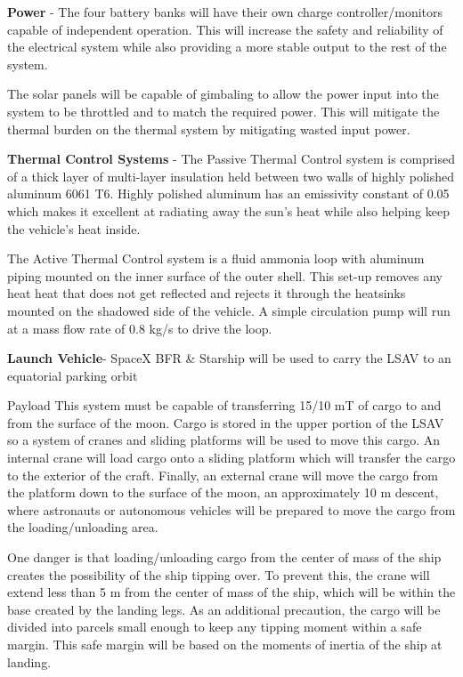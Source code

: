 \documentclass[10pt]{article}
\begin{document}
\textbf{Power} - The four battery banks will have their own charge
controller/monitors capable of independent operation. This will
increase the safety and reliability of the electrical system while
also providing a more stable output to the rest of the system.


The solar panels will be capable of gimbaling to allow the power input
into the system to be throttled and to match the required power. This
will mitigate the thermal burden on the thermal system by mitigating
wasted input power.

\textbf{Thermal Control Systems} - The Passive Thermal Control system
is comprised of a thick layer of multi-layer insulation held between
two walls of highly polished aluminum 6061 T6.  Highly polished
aluminum has an emissivity constant of 0.05 which makes it excellent
at radiating away the sun’s heat while also helping keep the vehicle’s
heat inside.

The Active Thermal Control system is a fluid ammonia loop with
aluminum piping mounted on the inner surface of the outer shell.  This
set-up removes any heat heat that does not get reflected and rejects
it through the heatsinks mounted on the shadowed side of the vehicle.
A simple circulation pump will run at a mass flow rate of 0.8 kg/s to
drive the loop.


\textbf{Launch Vehicle}- SpaceX BFR \& Starship will be used to carry the LSAV
to an equatorial parking orbit

Payload This system must be capable of transferring 15/10 mT of cargo
to and from the surface of the moon. Cargo is stored in the upper
portion of the LSAV so a system of cranes and sliding platforms will
be used to move this cargo. An internal crane will load cargo onto a
sliding platform which will transfer the cargo to the exterior of the
craft. Finally, an external crane will move the cargo from the
platform down to the surface of the moon, an approximately 10 m
descent, where astronauts or autonomous vehicles will be prepared to
move the cargo from the loading/unloading area.

One danger is that loading/unloading cargo from the center of mass of
the ship creates the possibility of the ship tipping over. To prevent
this, the crane will extend less than 5 m from the center of mass of
the ship, which will be within the base created by the landing
legs. As an additional precaution, the cargo will be divided into
parcels small enough to keep any tipping moment within a safe
margin. This safe margin will be based on the moments of inertia of
the ship at landing.
\end{document}
